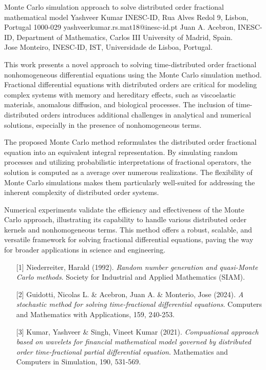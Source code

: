 \begin{talk}
  {Monte Carlo simulation approach to solve distributed order fractional mathematical model}%
  {Yashveer Kumar}%
  {INESC-ID, Rua Alves Redol 9, Lisbon, Portugal 1000-029}%
  {yashveerkumar.rs.mat18@inesc-id.pt}%
  {Juan A. Acebron, INESC-ID,  Department of Mathematics, Carlos III University of Madrid, Spain.\\
  	Jose Monteiro, INESC-ID, IST, Universidade de Lisboa, Portugal.}%
			
			
This work presents a novel approach to solving time-distributed order fractional nonhomogeneous differential equations using the Monte Carlo simulation method. Fractional differential equations with distributed orders are critical for modeling complex systems with memory and hereditary effects, such as viscoelastic materials, anomalous diffusion, and biological processes. The inclusion of time-distributed orders introduces additional challenges in analytical and numerical solutions, especially in the presence of nonhomogeneous terms.

The proposed Monte Carlo method reformulates the distributed order fractional equation into an equivalent integral representation. By simulating random processes and utilizing probabilistic interpretations of fractional operators, the solution is computed as a average over numerous realizations. The flexibility of Monte Carlo simulations makes them particularly well-suited for addressing the inherent complexity of distributed order systems.

Numerical experiments validate the efficiency and effectiveness of the Monte Carlo approach, illustrating its capability to handle various distributed order kernels and nonhomogeneous terms. This method offers a robust, scalable, and versatile framework for solving fractional differential equations, paving the way for broader applications in science and engineering.

\medskip
\begin{enumerate}
	\item[{[1]}] Niederreiter, Harald (1992). {\it Random number generation and quasi-Monte Carlo methods}. Society for Industrial and Applied Mathematics (SIAM).
	\item[{[2]}] Guidotti, Nicolas L. \& Acebron, Juan A.  \&  Monterio, Jose (2024). {\it A stochastic method for solving time-fractional differential equations}. Computers and Mathematics with Applications, 159, 240-253.
	\item[{[3]}] Kumar, Yashveer \& Singh, Vineet Kumar (2021). {\it Compuational approach based on wavelets for financial mathematical model governed by distributed order time-fractional partial differential equation}. Mathematics and Computers in Simulation, 190, 531-569.
\end{enumerate}
\end{talk}

